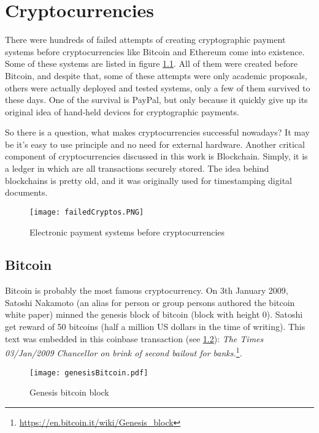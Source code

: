 \chapter{Cryptocurrencies}

There were hundreds of failed attempts of creating cryptographic payment systems before cryptocurrencies like Bitcoin and Ethereum come into existence. Some of these systems are listed in figure \ref{paymentSystems}. All of them were created before Bitcoin, and despite that, some of these attempts were only academic proposals, others were actually deployed and tested systems, only a few of them survived to these days. One of the survival is PayPal, but only because it quickly give up its original idea of hand-held devices for cryptographic payments.\cite{wayner1997digital}

So there is a question, what makes cryptocurrencies successful nowadays?  It may be it's easy to use principle and no need for external hardware. 
Another critical component of cryptocurrencies discussed in this work is Blockchain. Simply, it is a ledger in which are all transactions securely stored. The idea behind blockchains is pretty old, and it was originally used for timestamping digital documents.\cite{haber1990time} 


\begin{figure}[h]
    \centering
    \texttt{[image: failedCryptos.PNG]}
    \caption{Electronic payment systems before cryptocurrencies \cite{narayanan2016bitcoin}}
    \label{paymentSystems}
\end{figure}


\section{Bitcoin}
Bitcoin is probably the most famous cryptocurrency. On 3th January 2009, Satoshi Nakamoto (an alias for person or group persons authored the bitcoin white paper) minned the genesis block of bitcoin (block with height 0). Satoshi get reward of 50 bitcoins (half a million US dollars in the time of writing). This text was embedded in this coinbase transaction (see \ref{genesisBitcoin}): \textit{The Times 03/Jan/2009 Chancellor on brink of second bailout for banks.}\footnote{\url{https://en.bitcoin.it/wiki/Genesis\_block}}\cite{newYorkerBTC}. 

\begin{figure}[h]
    \centering
    \texttt{[image: genesisBitcoin.pdf]}
    \caption{Genesis bitcoin block}
    \label{genesisBitcoin}
\end{figure}

